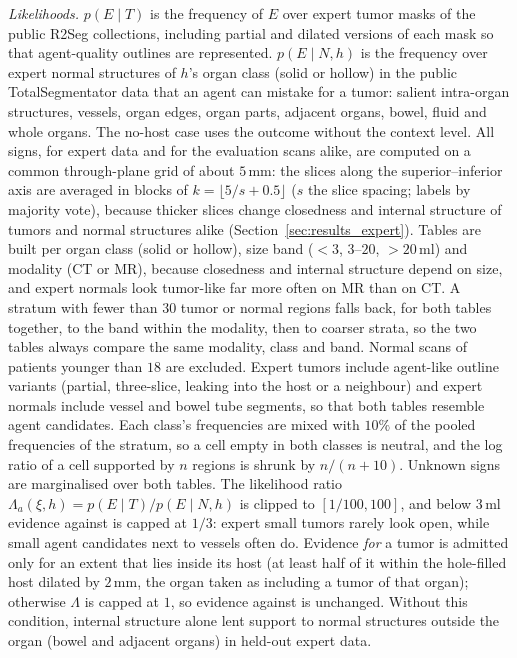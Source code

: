 \documentclass[fleqn,10pt]{olplainarticle}
\begin{document}
\emph{Likelihoods.} $p(E\mid T)$ is the frequency of $E$ over expert tumor masks of the public R2Seg collections, including
partial and dilated versions of each mask so that agent-quality outlines are represented. $p(E\mid N,h)$ is the frequency over
expert normal structures of $h$'s organ class (solid or hollow) in the public TotalSegmentator data that an agent can mistake for a tumor:
salient intra-organ structures, vessels, organ edges, organ parts, adjacent organs, bowel, fluid and whole organs. The no-host
case uses the outcome without the context level. All signs, for expert data and for the evaluation scans alike, are computed on a common through-plane grid of about $5$\,mm: the
slices along the superior--inferior axis are averaged in blocks of $k=\lfloor 5/s+0.5\rfloor$ ($s$ the slice spacing; labels by
majority vote), because thicker slices change closedness and internal structure of tumors and normal structures alike
(Section~\ref{sec:results_expert}). Tables are built per organ class (solid or hollow), size band ($<3$, $3$--$20$, $>20$\,ml) and modality (CT or MR), because closedness and
internal structure depend on size, and expert normals look tumor-like far more often on MR than on CT. A stratum with fewer than
$30$ tumor or normal regions falls back, for both tables together, to the band within the modality, then to coarser strata, so
the two tables always compare the same modality, class and band. Normal scans of patients younger than $18$ are excluded. Expert tumors include agent-like outline variants (partial, three-slice, leaking into the host
or a neighbour) and expert normals include vessel and bowel tube segments, so that both tables resemble agent candidates. Each
class's frequencies are mixed with $10\%$ of the pooled frequencies of the stratum, so a cell empty in both classes is neutral, and
the log ratio of a cell supported by $n$ regions is shrunk by $n/(n+10)$. Unknown signs are marginalised over both tables. The
likelihood ratio $\Lambda_a(\xi,h)=p(E\mid T)/p(E\mid N,h)$ is clipped to $[1/100,100]$, and below $3$\,ml evidence against is
capped at $1/3$: expert small tumors rarely look open, while small agent candidates next to vessels often do. Evidence \emph{for} a tumor is admitted only
for an extent that lies inside its host (at least half of it within the hole-filled host dilated by $2$\,mm, the organ taken as
including a tumor of that organ); otherwise $\Lambda$ is capped at $1$, so evidence against is unchanged. Without this condition,
internal structure alone lent support to normal structures outside the organ (bowel and adjacent organs) in held-out expert
data.
\end{document}
